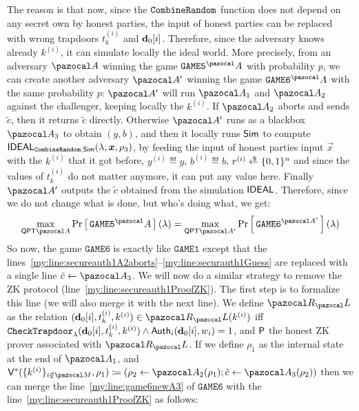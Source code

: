 \begin{proofE}
\begin {pcimage}
{{      }}
  \end{pcimage}
  The reason is that now, since the $\CombineRandom{}$ function does not depend on any secret own by honest parties, the input of honest parties can be replaced with wrong trapdoors $t_k^{(i)}$ and $\vect{d}_0[i]$. Therefore, since the adversary knows already $k^{(i)}$, it can simulate locally the ideal world. More precisely, from an adversary $\cA$ winning the game $\texttt{GAME5}^\cA$ with probability $p$, we can create another adversary $\cA'$ winning the game $\texttt{GAME6}^\cA$ with the same probability $p$: $\cA'$ will run $\cA_1$ and $\cA_2$ against the challenger, keeping locally the $k^{(i)}$. If $\cA_2$ aborts and sends $\tilde{c}$, then it returns $\tilde{c}$ directly. Otherwise $\cA'$ runs as a blackbox $\cA_3$ to obtain $(y,b)$, and then it locally runs $\Sim$ to compute $\Ideal_{\CombineRandom,\Sim}(\lambda,\vec{x},\rho_3)$, by feeding the input of honest parties input $\vec{x}$ with the $k^{(i)}$ that it got before, $y^{(i)} \eqdef y$, $b^{(i)} \eqdef b$, $r^{(i)} \sample \{0,1\}^n$ and since the values of $t_k^{(i)}$ do not matter anymore, it can put any value here. Finally $\cA'$ outputs the $\tilde{c}$ obtained from the simulation $\Ideal$. Therefore, since we do not change what is done, but who's doing what, we get:
  \begin{align}
    \max_{\QPT{} \cA} \pr{\texttt{GAME5}^\cA}(\lambda) = \max_{\QPT{} \cA'} \pr{\texttt{GAME6}^{\cA'}}(\lambda)
  \end{align}
  So now, the game $\texttt{GAME6}$ is exactly like $\texttt{GAME1}$ except that the lines~\ref{my:line:secureauth1A2aborts}--\ref{my:line:securauth1Guess} are replaced with a single line $\tilde{c} \gets \cA_3$. We will now do a similar strategy to remove the ZK protocol (line~\ref{my:line:secureauth1ProofZK}). The first step is to formalize this line (we will also merge it with the next line). We define $\cR_\lang$ as the relation $(\vect{d}_0[i], t_k^{(i)}, k^{(i)}) \in \cR_\lang(k^{(i)})$ iff $\CheckHonestTrapdoor_\lambda(\vect{d}_0[i], t_k^{(i)}, k^{(i)}) \land \Auth_i(\vect{d}_0[i],w_i) = 1$, and $\P{}$ the honest ZK prover associated with $\cR_\lang$. If we define $\rho_1$ as the internal state at the end of $\cA_1$, and $\V{}^*(\{k^{(i)}\}_{i \notin \cM},\rho_1) \eqdef (\rho_2 \gets \cA_2(\rho_1); \tilde{c} \gets \cA_3(\rho_2))$ then we can merge the line~\ref{my:line:game6newA3} of $\texttt{GAME6}$ with the line~\ref{my:line:secureauth1ProofZK} as follows:
  \begin{pcimage}
    {\normalfont{}}
\end{pcimage}
\end{proofE}
